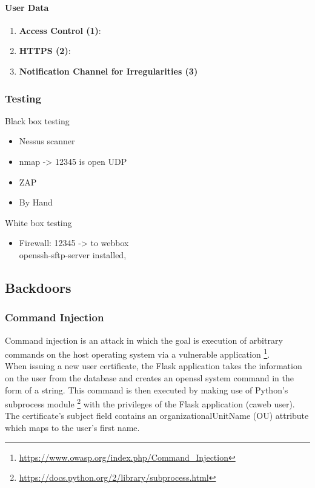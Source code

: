 \documentclass[english]{article}
\begin{document}
\paragraph{User Data}
\begin{enumerate}[label=(\alph*)]
\item \textbf{Access Control (1)}:
\item \textbf{HTTPS (2)}:
\item \textbf{Notification Channel for Irregularities (3)}
\end{enumerate} 


\subsubsection{Testing}

Black box testing
\begin{itemize}
	
	\item Nessus scanner
	\item nmap -> 12345 is open UDP
	\item ZAP
	\item By Hand

\end{itemize}

White box testing

\begin{itemize}
	\item Firewall: 12345 -> to webbox\\ openssh-sftp-server installed,  
\end{itemize}



\subsection{Backdoors}


\subsubsection{Command Injection}
Command injection is an attack in which the goal is execution of arbitrary commands on the host operating system via a vulnerable application \footnote{\url{https://www.owasp.org/index.php/Command_Injection}}.\\
 When issuing a new user certificate, the Flask application takes the information on the user from the database and creates an openssl system command in the form of a string. This command is then executed by making use of Python's subprocess module \footnote{\url{https://docs.python.org/2/library/subprocess.html}} with the privileges of the Flask application (caweb user). The certificate's subject field contains an organizationalUnitName (OU) attribute which maps to the user's first name. 
 
\end{document}
